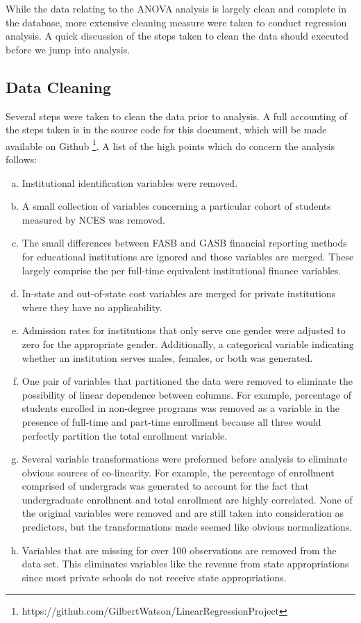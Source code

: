 \documentclass{article}
\begin{document}
While the data relating to the ANOVA analysis is largely clean and complete in the database, more extensive cleaning measure were taken to conduct regression analysis. A quick discussion of the steps taken to clean the data should executed before we jump into analysis.

\subsection{Data Cleaning}

Several steps were taken to clean the data prior to analysis. A full accounting of the steps taken is in the source code for this document, which will be made available on Github \footnote{https://github.com/GilbertWatson/LinearRegressionProject}. A list of the high points which do concern the analysis follows:

\begin{enumerate}[a)]
\item{} Institutional identification variables were removed.
\item{} A small collection of variables concerning a particular cohort of students measured by NCES was removed.
\item{} The small differences between FASB and GASB financial reporting methods for educational institutions are ignored and those variables are merged. These largely comprise the per full-time equivalent institutional finance variables.
\item{} In-state and out-of-state cost variables are merged for private institutions where they have no applicability.
\item{} Admission rates for institutions that only serve one gender were adjusted to zero for the appropriate gender. Additionally, a categorical variable indicating whether an institution serves males, females, or both was generated.
\item{} One pair of variables that partitioned the data were removed to eliminate the possibility of linear dependence between columns. For example, percentage of students enrolled in non-degree programs was removed as a variable in the presence of full-time and part-time enrollment because all three would perfectly partition the total enrollment variable.
\item{} Several variable transformations were preformed before analysis to eliminate obvious sources of co-linearity. For example, the percentage of enrollment comprised of undergrads was generated to account for the fact that undergraduate enrollment and total enrollment are highly correlated. None of the original variables were removed and are still taken into consideration as predictors, but the transformations made seemed like obvious normalizations.
\item{} Variables that are missing for over 100 observations are removed from the data set. This eliminates variables like the revenue from state appropriations since most private schools do not receive state appropriations.
\end{enumerate}
\end{document}
